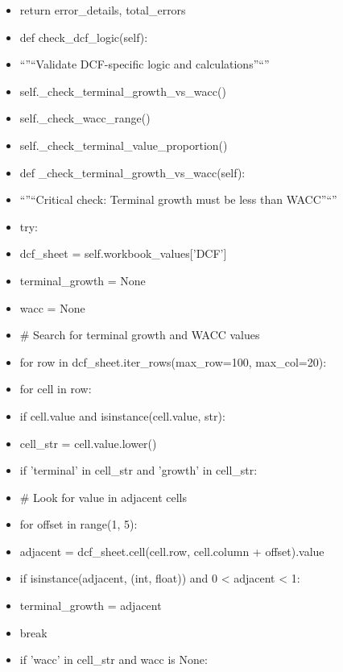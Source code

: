 \documentclass[11pt]{article}
\begin{document}
\begin{itemize}[leftmargin=*,itemsep=2pt,topsep=2pt]
\item {} return error\_\allowbreak{}details, total\_\allowbreak{}errors
\item {} def check\_\allowbreak{}dcf\_\allowbreak{}logic(self):
\item {} ``''``Validate DCF-specific logic and calculations''``''
\item {} self.\_\allowbreak{}check\_\allowbreak{}terminal\_\allowbreak{}growth\_\allowbreak{}vs\_\allowbreak{}wacc()
\item {} self.\_\allowbreak{}check\_\allowbreak{}wacc\_\allowbreak{}range()
\item {} self.\_\allowbreak{}check\_\allowbreak{}terminal\_\allowbreak{}value\_\allowbreak{}proportion()
\item {} def \_\allowbreak{}check\_\allowbreak{}terminal\_\allowbreak{}growth\_\allowbreak{}vs\_\allowbreak{}wacc(self):
\item {} ``''``Critical check: Terminal growth must be less than WACC''``''
\item {} try:
\item {} dcf\_\allowbreak{}sheet = self.workbook\_\allowbreak{}values['DCF']
\item {} terminal\_\allowbreak{}growth = None
\item {} wacc = None
\item {} \# Search for terminal growth and WACC values
\item {} for row in dcf\_\allowbreak{}sheet.iter\_\allowbreak{}rows(max\_\allowbreak{}row=100, max\_\allowbreak{}col=20):
\item {} for cell in row:
\item {} if cell.value and isinstance(cell.value, str):
\item {} cell\_\allowbreak{}str = cell.value.lower()
\item {} if 'terminal' in cell\_\allowbreak{}str and 'growth' in cell\_\allowbreak{}str:
\item {} \# Look for value in adjacent cells
\item {} for offset in range(1, 5):
\item {} adjacent = dcf\_\allowbreak{}sheet.cell(cell.row, cell.column + offset).value
\item {} if isinstance(adjacent, (int, float)) and 0 < adjacent < 1:
\item {} terminal\_\allowbreak{}growth = adjacent
\item {} break
\item {} if 'wacc' in cell\_\allowbreak{}str and wacc is None:

\end{itemize}
\end{document}
